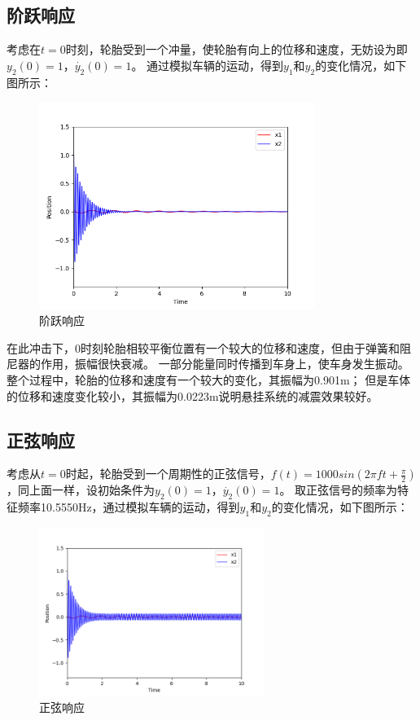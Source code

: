 \documentclass[UTF8, a4paper]{ctexart}
\begin{document}
\subsection{阶跃响应}
考虑在$t=0$时刻，轮胎受到一个冲量，使轮胎有向上的位移和速度，无妨设为即$y_2(0)=1$，$\dot{y_2}(0)=1$。
通过模拟车辆的运动，得到$y_1$和$y_2$的变化情况，如下图所示：
\begin{figure}[h]
    \centering
    \includegraphics[width=0.8\textwidth]{../fig/step_response.png}
    \caption{阶跃响应}
    \label{fig:step_response}
\end{figure}

在此冲击下，0时刻轮胎相较平衡位置有一个较大的位移和速度，但由于弹簧和阻尼器的作用，振幅很快衰减。
一部分能量同时传播到车身上，使车身发生振动。整个过程中，轮胎的位移和速度有一个较大的变化，其振幅为0.901m；
但是车体的位移和速度变化较小，其振幅为0.0223m说明悬挂系统的减震效果较好。

\clearpage
\subsection{正弦响应}
考虑从$t=0$时起，轮胎受到一个周期性的正弦信号，$f(t)=1000sin(2\pi f t+\frac{\pi}{2})$，同上面一样，设初始条件为$y_2(0)=1$，$\dot{y_2}(0)=1$。
取正弦信号的频率为特征频率10.5550Hz，通过模拟车辆的运动，得到$y_1$和$y_2$的变化情况，如下图所示：

\begin{figure}[h]
    \centering
    \includegraphics[width=0.65\textwidth]{../fig/sine_response.png}
    \caption{正弦响应}
    \label{fig:sin_response}
\end{figure}
\end{document}
